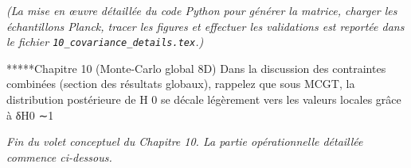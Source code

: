 \noindent\emph{(La mise en œuvre détaillée du code Python pour générer la matrice, charger les échantillons Planck, tracer les figures et effectuer les validations est reportée dans le fichier \texttt{10\_covariance\_details.tex}.)}

*****Chapitre 10 (Monte-Carlo global 8D)
Dans la discussion des contraintes combinées (section des résultats globaux), rappelez que sous MCGT, la distribution postérieure de H 0 se décale légèrement vers les valeurs locales grâce à δH0 ∼1%

\noindent\emph{Fin du volet conceptuel du Chapitre 10. La partie opérationnelle détaillée commence ci-dessous.}